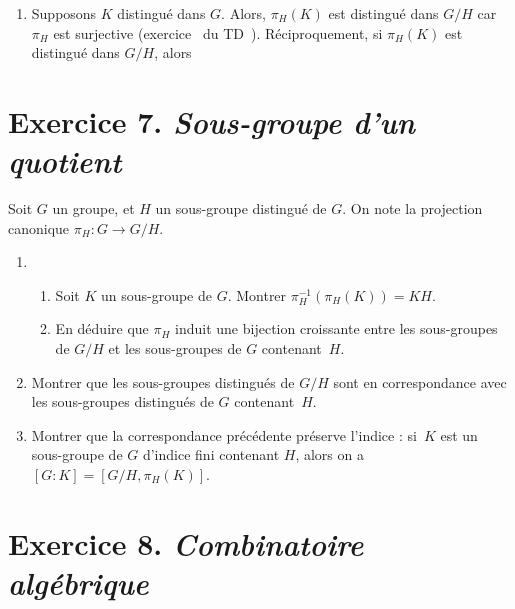 \documentclass[./main]{subfiles}
\begin{document}
  \begin{enumerate}
    \item Supposons $K$ distingué dans $G$. Alors, $\pi_H(K)$ est distingué dans $G / H$ car $\pi_H$ est surjective (exercice~ du TD~).
      Réciproquement, si $\pi_H(K)$ est distingué dans $G / H$, alors 
  \end{enumerate}

  \section{Exercice 7. \textit{Sous-groupe d'un quotient}}
  \begin{enonce}
    Soit $G$ un groupe, et $H$ un sous-groupe distingué de $G$. On note la projection canonique $\pi_H : G \to G/H$.
    \begin{enumerate}
      \item
        \begin{enumerate}
          \item Soit $K$ un sous-groupe de $G$. Montrer $\pi_H^{-1}(\pi_H(K)) = K H$.
          \item En déduire que $\pi_H$ induit une bijection croissante entre les sous-groupes de $G / H$ et les sous-groupes de $G$ contenant~$H$.
        \end{enumerate}
      \item Montrer que les sous-groupes distingués de $G / H$ sont en correspondance avec les sous-groupes distingués de $G$ contenant~$H$.
      \item Montrer que la correspondance précédente préserve l'indice : si~$K$ est un sous-groupe de $G$ d'indice fini contenant $H$, alors on a $[G : K] = [G/H, \pi_H(K)]$.
    \end{enumerate}
  \end{enonce}

  \section{Exercice 8. \textit{Combinatoire algébrique}}
\end{document}
